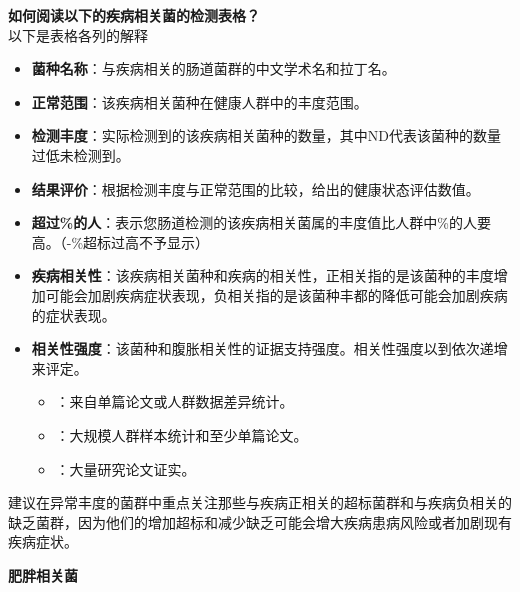 \documentclass[UTF8]{ctexart}
\begin{document}
\begin{tcolorbox}[
    enhanced,
    colback=lightpurple!10, %
    colframe=lightpurple!10,  %
    arc=3mm,
    boxrule=0.5pt,
    width=\textwidth,
    top=8pt,
    bottom=8pt
]
{\small{\color{lightpurple}\faQuestionCircle}\quad \textbf{如何阅读以下的疾病相关菌的检测表格？}\\
{\color{orange!50}\faComments}\quad 以下是表格各列的解释
\begin{itemize}
    \item \textbf{菌种名称}：与疾病相关的肠道菌群的中文学术名和拉丁名。
    \item \textbf{正常范围}：该疾病相关菌种在健康人群中的丰度范围。
    \item \textbf{检测丰度}：实际检测到的该疾病相关菌种的数量，其中ND代表该菌种的数量过低未检测到。
    \item \textbf{结果评价}：根据检测丰度与正常范围的比较，给出的健康状态评估数值。
    \item \textbf{超过\%的人}：表示您肠道检测的该疾病相关菌属的丰度值比人群中\%的人要高。（-\%超标过高不予显示）
    \item \textbf{疾病相关性}：该疾病相关菌种和疾病的相关性，正相关指的是该菌种的丰度增加可能会加剧疾病症状表现，负相关指的是该菌种丰都的降低可能会加剧疾病的症状表现。
    \item \textbf{相关性强度}：该菌种和腹胀相关性的证据支持强度。相关性强度以{\small\color{lightgray}\faStar}到{\small\color{lightgray}\faStar \faStar \faStar}依次递增来评定。
    \begin{itemize}
        \item \small{\color{lightgray}\faStar}：来自单篇论文或人群数据差异统计。
        \item \small{\color{lightgray}\faStar\faStar}：大规模人群样本统计和至少单篇论文。
        \item \small{\color{lightgray}\faStar\faStar\faStar}：大量研究论文证实。
    \end{itemize}
\end{itemize}
建议在异常丰度的菌群中重点关注那些与疾病正相关的超标菌群和与疾病负相关的缺乏菌群，因为他们的增加超标和减少缺乏可能会增大疾病患病风险或者加剧现有疾病症状。
}
\end{tcolorbox}

\newpage

\begin{tcolorbox}[
    enhanced,
    colback=white,
    colframe=white,
    arc=2mm,
    boxrule=0pt,
    width=\textwidth,
    left=15pt,
    right=15pt,
    top=10pt,
    bottom=10pt,
    drop shadow={
        opacity=0.2,
        color=customTeal
    },
    borderline west={5pt}{0pt}{customTeal}
]
\textcolor{customTeal}{\Large\textbf{肥胖相关菌}}
\end{tcolorbox}
\end{document}
